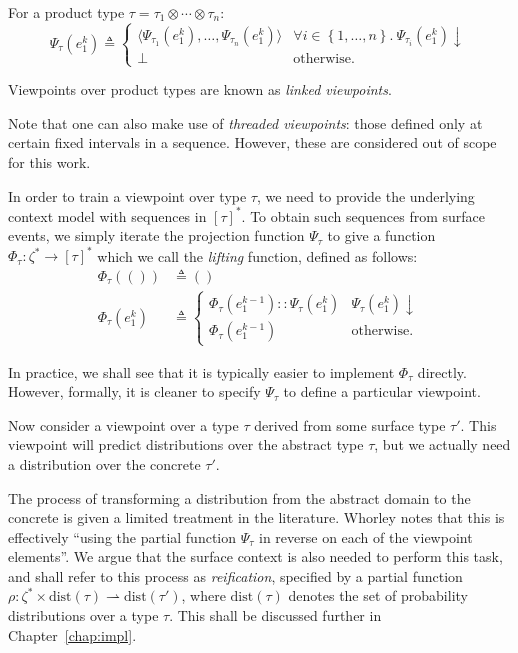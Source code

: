 \documentclass[12pt,a4paper,twoside,openright]{report}
\newcommand{\set}[1]{ \left\{ #1 \right\} }
\begin{document}
For a product type $\tau = \tau_1 \otimes \cdots \otimes \tau_n$:
$$ \Psi_\tau(e_1^k) \triangleq
\begin{cases}
  \langle\Psi_{\tau_1}(e_1^k), \ldots, \Psi_{\tau_n}(e_1^k)\rangle & \forall i
  \in \set{1,\ldots,n}.\
  \Psi_{\tau_i}(e_1^k)\downarrow \\
  \bot & \text{otherwise.}
\end{cases}
$$

Viewpoints over product types are known as \emph{linked viewpoints}. 

Note that one can also make use of \emph{threaded viewpoints}: those defined
only at certain fixed intervals in a sequence. However, these are considered out
of scope for this work.

In order to train a viewpoint over type $\tau$, we need to provide the
underlying context model with sequences in $[\tau]^*$. To obtain such sequences
from surface events, we simply iterate the projection function $\Psi_\tau$ to
give a function $\Phi_\tau : \zeta^* \rightarrow [\tau]^*$ which we call the
\emph{lifting} function, defined as follows:
\begin{align*}
  \Phi_\tau(()) &\triangleq () \\
  \Phi_\tau(e_1^k) &\triangleq \begin{cases}
    \Phi_\tau(e_1^{k-1})::\Psi_\tau(e_1^k) & \Psi_\tau(e_1^k)\downarrow \\
    \Phi_\tau(e_1^{k-1}) & \text{otherwise.}
  \end{cases}
\end{align*}

In practice, we shall see that it is typically easier to implement $\Phi_\tau$
directly. However, formally, it is cleaner to specify $\Psi_\tau$ to define a
particular viewpoint.

Now consider a viewpoint over a type $\tau$ derived from some surface type
$\tau'$. This viewpoint will predict distributions over the abstract type
$\tau$, but we actually need a distribution over the concrete $\tau'$. 

The process of transforming a distribution from the abstract domain to the
concrete is given a limited treatment in the literature. Whorley
\cite{whorley2013phd} notes that this is effectively ``using the partial
function $\Psi_\tau$ in reverse on each of the viewpoint elements''. We argue
that the surface context is also needed to perform this task, and shall refer to
this process as \emph{reification}, specified by a partial function $\rho :
\zeta^* \times \mathrm{dist}(\tau) \rightharpoonup \mathrm{dist}(\tau')$, where
$\mathrm{dist}(\tau)$ denotes the set of probability distributions over a type
$\tau$. This shall be discussed further in Chapter~\ref{chap:impl}.
\end{document}
